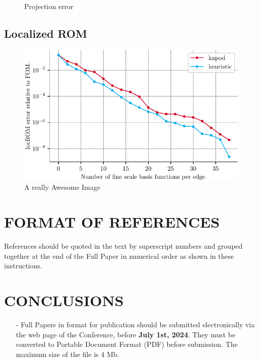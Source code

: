 \documentclass[a4paper]{eccomas_paper-2024}
\begin{document}
\begin{figure}[!htb]
  \caption{Projection error }\label{fig:proj_error_right_heuristic}
\endminipage
\end{figure}

\subsection{Localized ROM}

\begin{figure}[!htb]
    \includegraphics[width=\linewidth]{../figures/beam/fig_loc_rom_error.pdf}
    \caption{A really Awesome Image}\label{fig:loc_rom_error}
\end{figure}

\section{FORMAT OF REFERENCES}

References should be quoted in the text by superscript
numbers \cite{McQuerry18,nssga,Oden18} and grouped together at the end of the Full Paper in numerical order as shown in these instructions.

\section{CONCLUSIONS}

\begin{itemize}
\item[-] Full Papers in format for publication should be submitted electronically via the web page of the Conference, before \textbf{July 1st, 2024}. They must be converted to  Portable Document Format (PDF) before submission. The maximum size of the file is 4 Mb.
\end{itemize}
\end{document}
